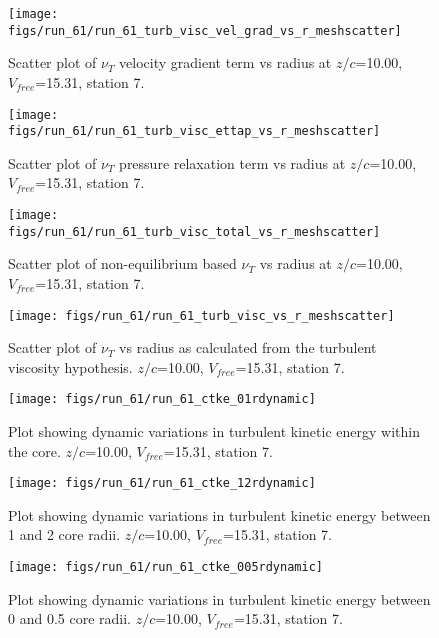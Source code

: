 \begin{figure}[H]
\centering
\texttt{[image: figs/run\_61/run\_61\_turb\_visc\_vel\_grad\_vs\_r\_meshscatter]}
\caption{Scatter plot of $\nu_T$ velocity gradient term vs radius at $z/c$=10.00, $V_{free}$=15.31, station 7.}
\end{figure}


\begin{figure}[H]
\centering
\texttt{[image: figs/run\_61/run\_61\_turb\_visc\_ettap\_vs\_r\_meshscatter]}
\caption{Scatter plot of $\nu_T$ pressure relaxation term vs radius at $z/c$=10.00, $V_{free}$=15.31, station 7.}
\end{figure}


\begin{figure}[H]
\centering
\texttt{[image: figs/run\_61/run\_61\_turb\_visc\_total\_vs\_r\_meshscatter]}
\caption{Scatter plot of non-equilibrium based $\nu_T$ vs radius at $z/c$=10.00, $V_{free}$=15.31, station 7.}
\end{figure}


\begin{figure}[H]
\centering
\texttt{[image: figs/run\_61/run\_61\_turb\_visc\_vs\_r\_meshscatter]}
\caption{Scatter plot of $\nu_T$ vs radius as calculated from the turbulent viscosity hypothesis. $z/c$=10.00, $V_{free}$=15.31, station 7.}
\end{figure}


\begin{figure}[H]
\centering
\texttt{[image: figs/run\_61/run\_61\_ctke\_01rdynamic]}
\caption{Plot showing dynamic variations in turbulent kinetic energy within the core. $z/c$=10.00, $V_{free}$=15.31, station 7.}
\end{figure}


\begin{figure}[H]
\centering
\texttt{[image: figs/run\_61/run\_61\_ctke\_12rdynamic]}
\caption{Plot showing dynamic variations in turbulent kinetic energy between 1 and 2 core radii. $z/c$=10.00, $V_{free}$=15.31, station 7.}
\end{figure}


\begin{figure}[H]
\centering
\texttt{[image: figs/run\_61/run\_61\_ctke\_005rdynamic]}
\caption{Plot showing dynamic variations in turbulent kinetic energy between 0 and 0.5 core radii. $z/c$=10.00, $V_{free}$=15.31, station 7.}
\end{figure}


